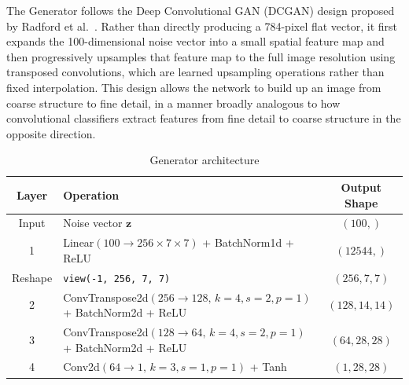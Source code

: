\documentclass[12pt,a4paper]{article}
\begin{document}
The Generator follows the Deep Convolutional GAN (DCGAN) design proposed by
Radford et al.\ \cite{radford2015}. Rather than directly producing a 784-pixel flat
vector, it first expands the 100-dimensional noise vector into a small spatial feature
map and then progressively upsamples that feature map to the full image resolution using
transposed convolutions, which are learned upsampling operations rather than fixed
interpolation. This design allows the network to build up an image from coarse
structure to fine detail, in a manner broadly analogous to how convolutional classifiers
extract features from fine detail to coarse structure in the opposite direction.

\begin{table}[H]
    \begin{center}
        \small
        \begin{tabular}{|c|L{8.6cm}|c|}
            \hline
            \textbf{Layer} & \textbf{Operation} & \textbf{Output Shape} \\
            \hline
            Input & Noise vector $\mathbf{z}$ & $(100,)$ \\
             & Linear$(100 \to 256 \times 7 \times 7)$ + BatchNorm1d + ReLU & $(12544,)$ \\
            \hline
            Reshape & \texttt{view(-1, 256, 7, 7)} & $(256, 7, 7)$ \\
             & ConvTranspose2d$(256 \to 128,\, k{=}4, s{=}2, p{=}1)$ + BatchNorm2d + ReLU & $(128, 14, 14)$ \\
             & ConvTranspose2d$(128 \to 64,\, k{=}4, s{=}2, p{=}1)$ + BatchNorm2d + ReLU & $(64, 28, 28)$ \\
             & Conv2d$(64 \to 1,\, k{=}3, s{=}1, p{=}1)$ + Tanh & $(1, 28, 28)$ \\
            \hline
        \end{tabular}
        \caption{Generator architecture}
        \label{tab:generator}
    \end{center}
\end{table}
\end{document}
